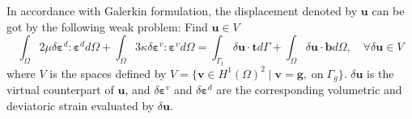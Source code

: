 In accordance with Galerkin formulation, the displacement denoted by $\boldsymbol u$ can be got by the following weak problem: 
Find $\boldsymbol u \in V$
\begin{equation}\label{weak_penalty}
\int_\Omega 2\mu \delta \boldsymbol \varepsilon^d : \boldsymbol \varepsilon^d d\Omega +
\int_\Omega 3\kappa \delta \boldsymbol \varepsilon^v : \boldsymbol \varepsilon^v d\Omega =
\int_{\Gamma_t} \delta \boldsymbol u \cdot \boldsymbol t d\Gamma + \int_\Omega \delta \boldsymbol u \cdot \boldsymbol b d\Omega,  \quad
\forall \delta \boldsymbol u \in V
\end{equation}
where $V$ is the spaces defined by $V=\{\boldsymbol v \in H^1(\Omega)^2\;\vert\;\boldsymbol v = \boldsymbol g, \; \textrm{on} \; \Gamma_g\}$. $\delta \boldsymbol u$ is the virtual counterpart of $\boldsymbol u$, and $\delta \boldsymbol \varepsilon^v$ and $\delta \boldsymbol \varepsilon^d$ are the corresponding volumetric and deviatoric strain evaluated by $\delta \boldsymbol u$.

